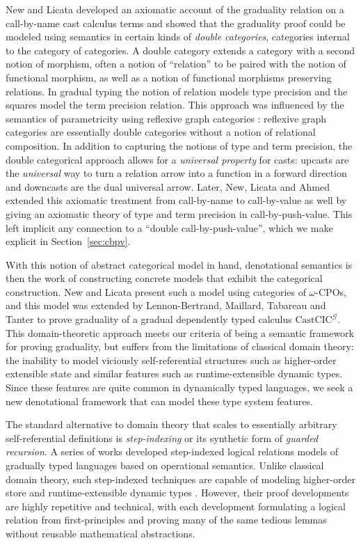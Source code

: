 New and Licata \cite{new-licata18} developed an axiomatic account of
the graduality relation on a call-by-name cast calculus terms and
showed that the graduality proof could be modeled using semantics in
certain kinds of \emph{double categories}, categories internal to the
category of categories. A double category extends a category with a
second notion of morphism, often a notion of ``relation'' to be paired
with the notion of functional morphism, as well as a notion of
functional morphisms preserving relations. In gradual typing the
notion of relation models type precision and the squares model the
term precision relation. This approach was influenced by the semantics
of parametricity using reflexive graph categories
\cite{ma-reynolds,dunphythesis,reynoldsprogramme}: reflexive graph
categories are essentially double categories without a notion of
relational composition. In addition to capturing the notions of type
and term precision, the double categorical approach allows for a
\emph{universal property} for casts: upcasts are the \emph{universal}
way to turn a relation arrow into a function in a forward direction
and downcasts are the dual universal arrow.  Later, New, Licata and
Ahmed \cite{new-licata-ahmed2019} extended this axiomatic treatment from
call-by-name to call-by-value as well by giving an axiomatic theory of
type and term precision in call-by-push-value. This left implicit any
connection to a ``double call-by-push-value'', which we make explicit
in Section~\ref{sec:cbpv}.

With this notion of abstract categorical model in hand, denotational
semantics is then the work of constructing concrete models that
exhibit the categorical construction. New and Licata
\cite{new-licata18} present such a model using categories of
$\omega$-CPOs, and this model was extended by Lennon-Bertrand,
Maillard, Tabareau and Tanter to prove graduality of a gradual
dependently typed calculus $\textrm{CastCIC}^{\mathcal G}$. This
domain-theoretic approach meets our criteria of being a semantic
framework for proving graduality, but suffers from the limitations of
classical domain theory: the inability to model viciously
self-referential structures such as higher-order extensible state and
similar features such as runtime-extensible dynamic types. Since these
features are quite common in dynamically typed languages, we seek a
new denotational framework that can model these type system features.

The standard alternative to domain theory that scales to essentially
arbitrary self-referential definitions is \emph{step-indexing} or its
synthetic form of \emph{guarded recursion}. A series of works
\cite{new-ahmed2018, new-licata-ahmed2019, new-jamner-ahmed19}
developed step-indexed logical relations models of gradually typed
languages based on operational semantics. Unlike classical domain
theory, such step-indexed techniques are capable of modeling
higher-order store and runtime-extensible dynamic types
\cite{appelmcallester01,ahmed06,neis09,new-jamner-ahmed19}. However,
their proof developments are highly repetitive and technical, with
each development formulating a logical relation from first-principles
and proving many of the same tedious lemmas without reusable
mathematical abstractions.



